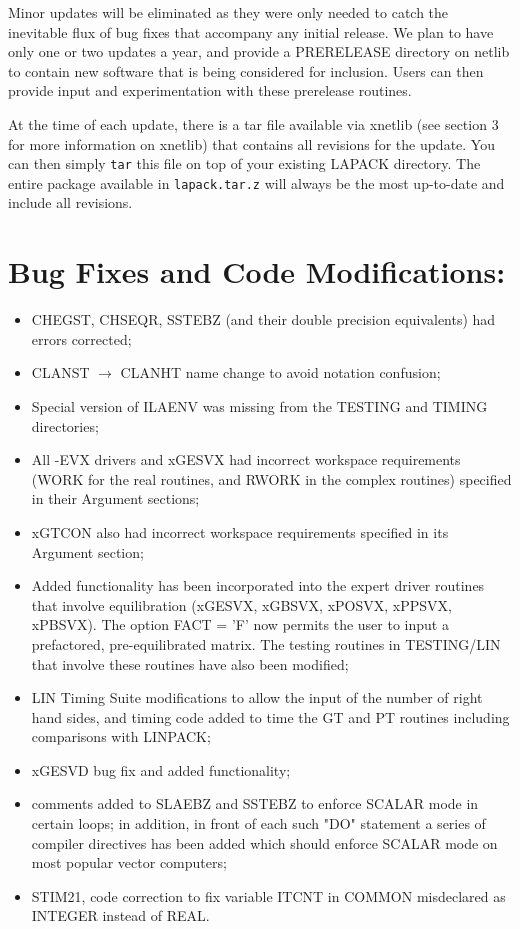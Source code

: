 Minor updates will be eliminated
as they were only needed to catch the inevitable flux of
bug fixes that accompany any initial release.  We plan to have only
one or two updates a year, and provide a PRERELEASE
directory on netlib to contain new software that is being considered for
inclusion.  Users can then provide input and experimentation with these
prerelease routines.

At the time of each update, there is a tar file available via xnetlib
(see section 3 for more information on xnetlib)
that contains all revisions for the update.  You can then simply {\tt tar}
this file on top of your existing LAPACK directory.  The entire package 
available in {\tt lapack.tar.z} will always be the most up-to-date and include
all revisions.

\section*{Bug Fixes and Code Modifications:}
\begin{itemize}
\item CHEGST, CHSEQR, SSTEBZ (and their double precision equivalents)
had errors corrected;
\item CLANST $\rightarrow$ CLANHT name change to avoid notation
confusion;
\item Special version of ILAENV was missing from the TESTING and TIMING
directories;
\item All -EVX drivers and xGESVX had incorrect workspace requirements
(WORK for the real routines, and RWORK in the complex routines)
specified in their Argument sections;
\item xGTCON also had incorrect workspace requirements specified in
its Argument section;
\item Added functionality has been incorporated into the expert driver
routines that involve equilibration (xGESVX, xGBSVX, xPOSVX, xPPSVX,
xPBSVX).  The option FACT = 'F' now permits the user to input a
prefactored, pre-equilibrated matrix.  The testing routines in
TESTING/LIN that involve these routines have also been modified;
\item LIN Timing Suite modifications to allow the input of the number
of right hand sides, and timing code added to time the GT and PT routines 
including comparisons with LINPACK;
\item xGESVD bug fix and added functionality;
\item comments added to SLAEBZ and SSTEBZ to enforce SCALAR mode in
certain loops; in addition, in front of each such "DO" statement
a series of compiler directives has been added which should
enforce SCALAR mode on most popular vector computers;
\item STIM21, code correction to fix variable ITCNT in COMMON misdeclared as
INTEGER instead of REAL.
\end{itemize}
